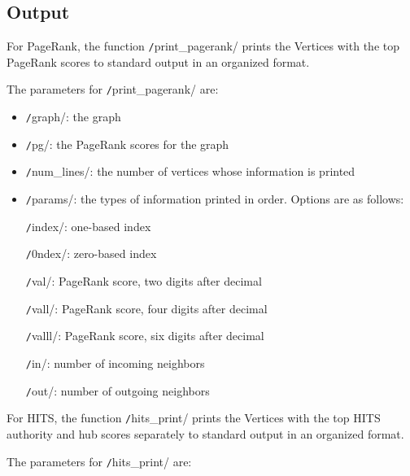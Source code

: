 \documentclass[12pt, titlepage, twoside]{amsart}
\theoremstyle{remark}
\begin{document}
\subsection{Output}

For PageRank, the function \texttt/print_pagerank/ prints
the Vertices with the top PageRank scores to standard output in an organized format.

The parameters for \texttt/print_pagerank/ are:

\begin{itemize}[label={}]
\item \texttt/graph/: the graph

\item \texttt/pg/: the PageRank scores for the graph

\item \texttt/num_lines/: the number of vertices whose information is printed

\item \texttt/params/: the types of information printed in order. Options are as follows:

\texttt/index/: one-based index

\texttt/0ndex/: zero-based index

\texttt/val/: PageRank score, two digits after decimal

\texttt/vall/: PageRank score, four digits after decimal

\texttt/valll/: PageRank score, six digits after decimal

\texttt/in/: number of incoming neighbors

\texttt/out/: number of outgoing neighbors

\end{itemize}

For HITS, the function \texttt/hits_print/ prints
the Vertices with the top HITS authority and hub scores separately to standard output in
an organized format.

The parameters for \texttt/hits_print/ are:
\end{document}
